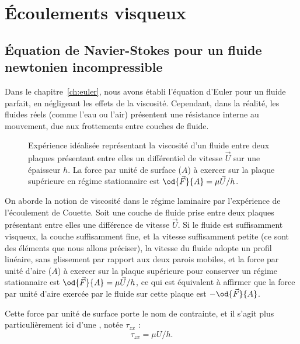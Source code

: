 \chapter{Écoulements visqueux}
\label{ch:newtonien}

\section{Équation de Navier-Stokes pour un fluide newtonien incompressible}

Dans le chapitre~\ref{ch:euler}, nous avons établi l'équation d'Euler pour un fluide parfait, en négligeant les effets de la viscosité. Cependant, dans la réalité, les fluides réels (comme l'eau ou l'air) présentent une résistance interne au mouvement, due aux frottements entre couches de fluide.

\begin{figure}
  \begin{center}
    
  \end{center}
  \caption{Expérience idéalisée représentant la viscosité d'un fluide entre deux plaques présentant entre elles un différentiel de vitesse $\vec{U}$ sur une épaisseur $h$. La force par unité de surface ($A$) à exercer sur la plaque supérieure en régime stationnaire est $\od{\vec{F}}{A} = \mu \vec{U}/h$.}
  \label{fig:couette}
\end{figure}

On aborde la notion de viscosité dans le régime laminaire par l'expérience de l'écoulement de Couette. Soit une couche de fluide prise entre deux plaques présentant entre elles une différence de vitesse $\vec{U}$. Si le fluide est suffisamment visqueux, la couche suffisamment fine, et la vitesse suffisamment petite (ce sont des éléments que nous allons préciser), la vitesse du fluide adopte un profil linéaire, sans glissement par rapport aux deux parois mobiles, et la force par unité d'aire ($A$) à exercer sur la plaque supérieure pour conserver un régime stationnaire est $\od{\vec{F}}{A} = \mu \vec{U}/h$, ce qui est équivalent à affirmer que la force par unité d'aire exercée par le fluide sur cette plaque est $-\od{\vec{F}}{A}$.

Cette force par unité de surface porte le nom de contrainte, et il s'agit plus particulièrement ici d'une , notée $\tau_{zx}$ :
\begin{displaymath}
  \tau_{zx} = \mu U/h.
\end{displaymath}

